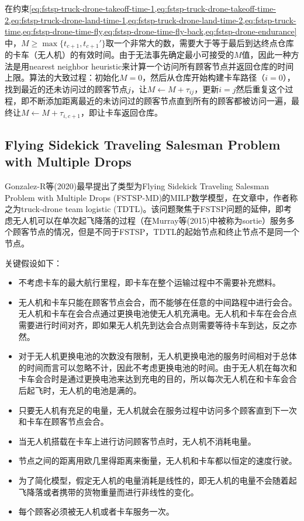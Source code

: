 在约束\cref{eq:fstsp-truck-drone-takeoff-time-1,eq:fstsp-truck-drone-takeoff-time-2,eq:fstsp-truck-drone-land-time-1,eq:fstsp-truck-drone-land-time-2,eq:fstsp-truck-time,eq:fstsp-drone-time-fly,eq:fstsp-drone-time-fly-back,eq:fstsp-drone-endurance}中，$M\geq \max\{t_{c+1}, t_{c+1}'\}$取一个非常大的数，需要大于等于最后到达终点仓库的卡车（无人机）的有效时间。由于无法事先确定最小可接受的$M$值，因此一种方法是用nearest neighbor heuristic来计算一个访问所有顾客节点并返回仓库的时间上限。算法的大致过程：初始化$M = 0$，然后从仓库开始构建卡车路径（$i=0$），找到最近的还未访问过的顾客节点$j$，让$M \gets M + \tau_{ij}$，更新$i = j$然后重复这个过程，即不断添加距离最近的未访问过的顾客节点直到所有的顾客都被访问一遍，最终让$M \gets M+\tau_{i,c+1}$，即让卡车返回仓库。

\subsection{Flying Sidekick Traveling Salesman Problem with Multiple Drops}
Gonzalez-R等(2020)\cite{gonzalez-rTruckdroneTeamLogistics2020}最早提出了类型为Flying Sidekick Traveling Salesman Problem with Multiple Drops (FSTSP-MD)的MILP数学模型，在文章中，作者称之为truck-drone team logistic (TDTL)。该问题聚焦于FSTSP问题的延伸，即考虑无人机可以在单次起飞降落的过程（在Murray等(2015)\cite{murrayFlyingSidekickTraveling2015}中被称为sortie）服务多个顾客节点的情况，但是不同于FSTSP，TDTL的起始节点和终止节点不是同一个节点。

关键假设如下：
\begin{itemize}
    \item 不考虑卡车的最大航行里程，即卡车在整个运输过程中不需要补充燃料。
    \item 无人机和卡车只能在顾客节点会合，而不能够在任意的中间路程中进行会合。无人机和卡车在会合点通过更换电池使无人机充满电。无人机和卡车在会合点需要进行时间对齐，即如果无人机先到达会合点则需要等待卡车到达，反之亦然。
    \item 对于无人机更换电池的次数没有限制，无人机更换电池的服务时间相对于总体的时间而言可以忽略不计，因此不考虑更换电池的时间。由于无人机在每次和卡车会合时是通过更换电池来达到充电的目的，所以每次无人机在和卡车会合后起飞时，无人机的电池是满的。
    \item 只要无人机有充足的电量，无人机就会在服务过程中访问多个顾客直到下一次和卡车在顾客节点会合。
    \item 当无人机搭载在卡车上进行访问顾客节点时，无人机不消耗电量。
    \item 节点之间的距离用欧几里得距离来衡量，无人机和卡车都以恒定的速度行驶。
    \item 为了简化模型，假定无人机的电量消耗是线性的，即无人机的电量不会随着起飞降落或者携带的货物重量而进行非线性的变化。
    \item 每个顾客必须被无人机或者卡车服务一次。
\end{itemize}

